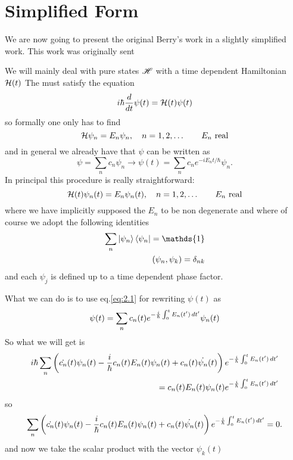 \section{Simplified Form}
We are now going to present the original Berry's work in a slightly simplified work. This work was originally sent 

We will mainly deal with pure states $ \mathscr{H} $ with a time dependent Hamiltonian $ \mathcal{H}(t) $
The \wf must satisfy the equation 
\begin{equation}
i\hbar \frac{d}{dt}\psi(t)=\mathcal{H}(t)\psi(t)
\label{eq:2.1}
\end{equation}
so formally one only has to find 
\begin{equation}
\mathcal{H} \psi_n=E_n\psi_n, \quad n=1,2,\dots \qquad E_n \text{ real} 
\end{equation}
and in general we already have that $ \psi $ can be written as
\begin{equation}
\psi=\sum_n c_n\psi_n\to \psi(t)=\sum_n c_n e^{-iE_nt/\hbar}\psi_n.
\end{equation}
In principal this procedure is really straightforward:
\begin{equation}
\mathcal{H}(t)\psi_n(t)=E_n\psi_n(t), \quad n=1,2,\dots \qquad E_n \text{ real}
\end{equation}
where we have implicitly supposed the $ E_n $ to be non degenerate and where of course we adopt the following identities
\begin{align}
	\sum_n \Ket{\psi_n}\Bra{\psi_n}=\mathds{1}\\
	\left(\psi_n,\psi_k\right) = \delta_{nk}
\end{align}
and each $ \psi_j $ is defined up to a time dependent phase factor.

What we can do is to use eq.\eqref{eq:2.1} for rewriting $ \psi(t) $ as 
\begin{equation}
\psi(t)=\sum_n c_n(t)e^{-\frac{i}{\hbar}\int_{0}^{t}E_n(t')\mathop{}\!d t'}\psi_n(t)
\end{equation}
So what we will get is
\begin{align}
i\hbar\sum_n\left(\dot{c_n}(t)\psi_n(t)-\frac{i}{\hbar}c_n(t)E_n(t)\psi_n(t)+c_n(t)\dot{\psi_n}(t) \right)e^{-\frac{i}{\hbar}\int_{0}^{t}E_n(t')\mathop{}\!d t'}\\
=c_n(t)E_n(t)\psi_n(t)e^{-\frac{i}{\hbar}\int_{0}^{t}E_n(t')\mathop{}\!d t'}
\end{align}
so 
\begin{align}
\sum_n\left(\dot{c_n}(t)\psi_n(t)-\frac{i}{\hbar}c_n(t)E_n(t)\psi_n(t)+c_n(t)\dot{\psi_n}(t) \right)e^{-\frac{i}{\hbar}\int_{0}^{t}E_n(t')\mathop{}\!d t'}=0.
\end{align}
and now we take the scalar product with the vector $ \psi_k(t) $